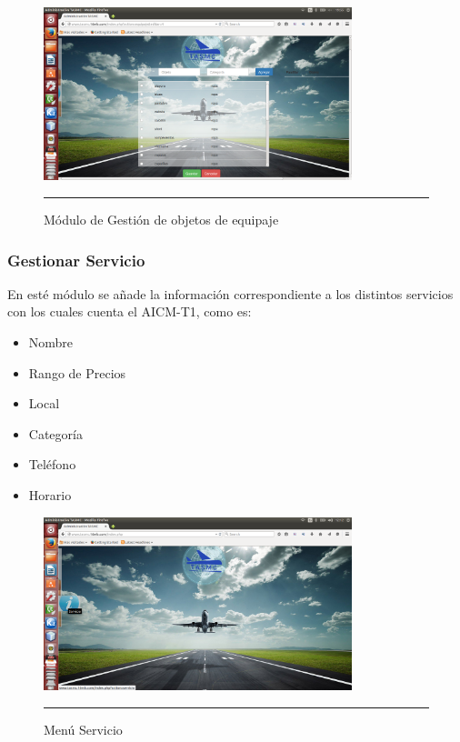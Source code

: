 \begin{figure}[h!]
	\centering
		\includegraphics[width=0.8\textwidth]{Figuras/objetosEquipaje.png}
		\rule{35em}{0.5pt}
	\caption[Módulo de Gestión de objetos de equipaje]{Módulo de Gestión de objetos de equipaje}
	\label{fig:moduloObjetos}
\end{figure}
\clearpage

\subsubsection{Gestionar Servicio}
En esté módulo se añade la información correspondiente a los distintos servicios con los cuales cuenta el AICM-T1, como es: 
\begin{itemize}
 \item Nombre
 \item Rango de Precios
 \item Local
 \item Categoría
 \item Teléfono
 \item Horario
\end{itemize}

\begin{figure}[h!]
	\centering
		\includegraphics[width=0.8\textwidth]{Figuras/indexServicio.png}
		\rule{35em}{0.5pt}
	\caption[Menú Servicio]{Menú Servicio}
	\label{fig:menuServicio}
\end{figure}
\clearpage

